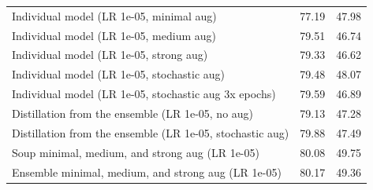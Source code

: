 \documentclass[nohyperref]{article}
\theoremstyle{plain}
\theoremstyle{definition}
\theoremstyle{remark}
\begin{document}
\begin{table}
\begin{center}
\begin{tabular}{lll}
            \midrule
            Individual model (LR 1e-05, minimal aug)                  &  77.19 &  47.98 \\
            Individual model (LR 1e-05, medium aug)                  &  79.51 &  46.74 \\
            Individual model (LR 1e-05, strong aug)               &  79.33 &  46.62 \\
            Individual model (LR 1e-05, stochastic aug)           &  79.48 &  48.07 \\
            Individual model (LR 1e-05, stochastic aug 3x epochs) &  79.59 &  46.89 \\
            Distillation from the ensemble (LR 1e-05, no aug)               &  79.13 &  47.28 \\
            Distillation from the ensemble (LR 1e-05, stochastic aug)       &  79.88 &  47.49 \\
            Soup minimal, medium, and strong aug (LR 1e-05)                              &  80.08 &  49.75 \\
            Ensemble minimal, medium, and strong aug (LR 1e-05)                          &  80.17 &  49.36 \\
            \bottomrule
            \end{tabular}
        \end{center}
        \label{tab:distill}
    \end{table}
    
\end{document}
